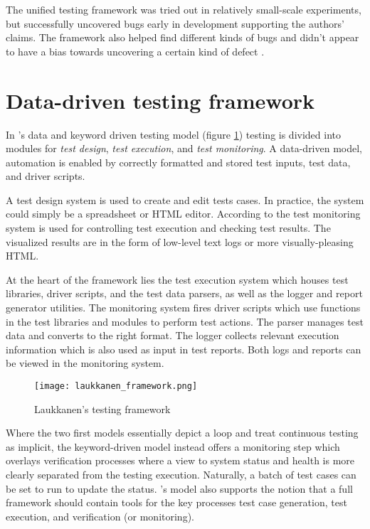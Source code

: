\documentclass[12pt,a4paper,oneside,pdftex]{report}
\begin{document}
The unified testing framework was tried out in relatively small-scale experiments, but successfully uncovered bugs early in development supporting the authors' claims. The framework also helped find different kinds of bugs and didn't appear to have a bias towards uncovering a certain kind of defect \citep{liu2009unified}.

\section{Data-driven testing framework}

In \citeauthor{laukkanen2006data}'s \citeyearpar{laukkanen2006data} data and keyword driven testing model (figure \ref{fig:laukkanen}) testing is divided into modules for \emph{test design}, \emph{test execution}, and \emph{test monitoring}. A data-driven model, automation is enabled by correctly formatted and stored test inputs, test data, and driver scripts.

A test design system is used to create and edit tests cases. In practice, the system could simply be a spreadsheet or HTML editor. According to \citet{laukkanen2006data} the test monitoring system is used for controlling test execution and checking test results. The visualized results are in the form of low-level text logs or more visually-pleasing HTML.

At the heart of the framework lies the test execution system which houses test libraries, driver scripts, and the test data parsers, as well as the logger and report generator utilities. The monitoring system fires driver scripts which use functions in the test libraries and modules to perform test actions. The parser manages test data and converts to the right format. The logger collects relevant execution information which is also used as input in test reports. Both logs and reports can be viewed in the monitoring system. \citep{laukkanen2006data}

\begin{figure}[H]
  \begin{center}
    \texttt{[image: laukkanen\_framework.png]}
    \caption{Laukkanen's testing framework \citep{laukkanen2006data}}
    \label{fig:laukkanen} 
  \end{center}
\end{figure}

Where the two first models essentially depict a loop and treat continuous testing as implicit, the keyword-driven model instead offers a monitoring step which overlays verification processes where a view to system status and health is more clearly separated from the testing execution. Naturally, a batch of test cases can be set to run to update the status. \citeauthor{laukkanen2006data}'s \citeyearpar{laukkanen2006data} model also supports the notion that a full framework should contain tools for the key processes test case generation, test execution, and verification (or monitoring).
\end{document}
